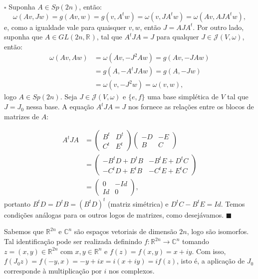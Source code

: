 \documentclass[12pt]{book}
\newenvironment{prova}[1]{$\square$ #1}{\hfill$\blacksquare$}
\newcommand{\complexo}[1]{\mathbb{C}^{#1}}
\newcommand{\estruturacomplexapadrao}{\mathcal{J}(V, \omega)}
\newcommand{\generalgroup}[2]{GL(#1, #2)}
\newcommand{\generalgroupreal}[1]{\generalgroup{#1}{\real{}}}
\newcommand{\gruposimpletico}[1]{Sp(#1)}
\newcommand{\real}[1]{\mathbb{R}^{#1}}
\begin{document}
	\begin{prova}
		Suponha $A \in Sp(2n)$, então:
		$$
		\omega(Av, Jw)= g(Av,w) = g(v,A^{t}w) = \omega(v, JA^{t}w) = \omega(Av, AJA^{t}w),
		$$
		e, como a igualdade vale para quaisquer $v,w$, então $J = AJA^{t}$. Por outro lado, suponha que $A \in \generalgroupreal{2n}$, tal que $A^{t}JA=J$ para qualquer $J \in \estruturacomplexapadrao$, então:
		$$
		\begin{aligned}
		\omega(Av, Aw) &= \omega(Av, -J^{2}Aw)=g(Av, -JAw) \\
		&= g(A, -A^{t}JAw) = g(A, -Jw) 
		\\
		&= \omega(v, -J^{2}w) = \omega(v, w), 
		\end{aligned}
		$$
		logo $A \in \gruposimpletico{2n}$. Seja $J \in \estruturacomplexapadrao$ e $\{e, f\}$ uma base simplética de $V$ tal que $J = J_{0}$ nessa base. A equação $A^{t}JA=J$ nos fornece as relações entre os blocos de matrizes de $A$:
		
		$$
		\begin{aligned}
			A^{t}JA&=
			\left(
			\begin{array}{cc}
			B^{t} & D^{t}
			\\
			C^{t} & E^{t}
			\end{array}
			\right)
			\left(
			\begin{array}{cc}
			-D & -E
			\\
			B & C
			\end{array}
			\right)
			\\
			&=
			\left(
			\begin{array}{cc}
			-B^{t}D +D^{t}B & -B^{t}E+D^{t}C
			\\
			-C^{t}D+E^{t}B & -C^{t}E+E^{t}C
			\end{array}
			\right)
			\\
			&=	
			\left(
			\begin{array}{cc}
			0 & -Id
			\\
			Id & 0
			\end{array}
			\right),
		\end{aligned}
		$$
		portanto $B^{t}D = D^{t}B = (B^{t}D)^{t}$ (matriz simétrica) e $D^{t}C-B^{t}E = Id$. Temos condições análogas para os outros logos de matrizes, como desejávamos.
	\end{prova}
	
	Sabemos que $\real{2n}$ e $\mathbb{C}^{n}$ são espaços vetoriais de dimensão $2n$, logo são isomorfos. Tal identificação pode ser realizada definindo $f:\real{2n}\to \complexo{n}$ tomando $z=(x,y) \in \real{2n}$ com $x,y \in \real{n}$ e $f(z) = f(x,y) =x+iy $. Com isso, $f(J_{0}z) = f(-y, x) = -y +ix = i(x+iy) = if(z)$, isto é, a aplicação de $J_{0}$ corresponde à multiplicação por $i$ nos complexos. 
	
\end{document}
